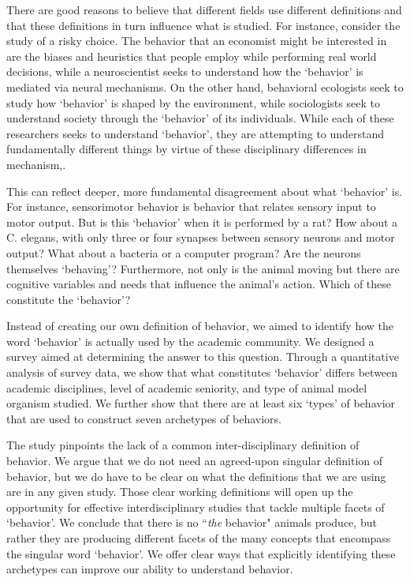 \documentclass[a4paper, 11pt]{article}
\begin{document}
There are good reasons to believe that different fields use different definitions and that these definitions in turn influence what is studied. For instance, consider the study of a risky choice. The behavior that an economist might be interested in are the biases and heuristics that people employ while performing real world decisions, while a neuroscientist seeks to understand how the `behavior' is mediated via neural mechanisms. On the other hand, behavioral ecologists seek to study how `behavior' is shaped by the environment, while sociologists seek to understand society through the `behavior' of its individuals. While each of these researchers seeks to understand `behavior', they are attempting to understand fundamentally different things by virtue of these disciplinary differences in mechanism,.

This can reflect deeper, more fundamental disagreement about what `behavior' is. For instance, sensorimotor behavior is behavior that relates sensory input to motor output. But is this `behavior' when it is performed by a rat? How about a C. elegans, with only three or four synapses between sensory neurons and motor output? What about a bacteria or a computer program? Are the neurons themselves `behaving'? Furthermore, not only is the animal moving but there are cognitive variables and needs that influence the animal's action. Which of these constitute the `behavior'?

Instead of creating our own definition of behavior, we aimed to identify how the word `behavior' is actually used by the academic community. We designed a survey aimed at determining the answer to this question. Through a quantitative analysis of survey data, we show that what constitutes `behavior' differs between academic disciplines, level of academic seniority, and type of animal model organism studied. We further show that there are at least six `types' of behavior that are used to construct seven archetypes of behaviors. 

The study pinpoints the lack of a common inter-disciplinary definition of behavior. We argue that we do not need an agreed-upon singular definition of behavior, but we do have to be clear on what the definitions that we are using are in any given study. Those clear working definitions will open up the opportunity for effective interdisciplinary studies that tackle multiple facets of `behavior'. We conclude that there is no ``\textit{the} behavior" animals produce, but rather they are producing different facets of the many concepts that encompass the singular word `behavior'. We offer clear ways that explicitly identifying these archetypes can improve our ability to understand behavior.
\end{document}
